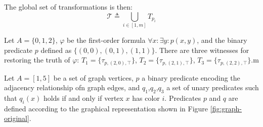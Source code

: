 The global set of transformations is then:
\[
\mathcal{T} \triangleq \bigcup_{i \in [1,m]} T_{p_i}
\]

\begin{example}
Let $A = \{0,1,2\}$, $\varphi$ be the first-order formula $\forall x : \exists y : p(x,y)$, and the binary predicate $p$ defined as $\{(0,0), (0,1), (1,1)\}$. There are three witnesses for restoring the truth of $\varphi$: $T_1=\{\tau_{p,(2,0),\top}\}$, $T_2=\{\tau_{p,(2,1),\top}\}$, $T_3=\{\tau_{p,(2,2),\top}\}$.m
\end{example}

\begin{example}
Let $A = [1,5]$ be a set of graph vertices, $p$ a binary predicate encoding the adjacency relationship ofn graph edges, and $q_1$,$q_2$,$q_3$ a set of unary predicates such that $q_i(x)$ holds if and only if vertex $x$ has color $i$. Predicates $p$ and $q$ are defined according to the graphical representation shown in Figure \ref{fig:graph-original}.


\end{example}
